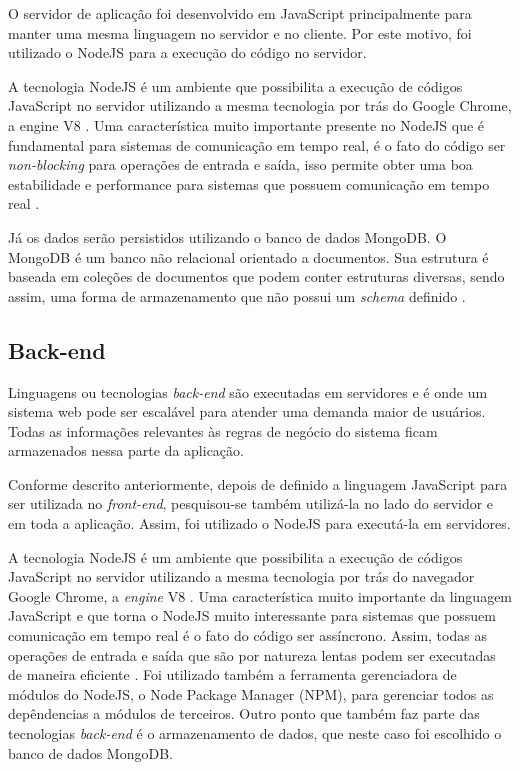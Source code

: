 O servidor de aplicação foi desenvolvido em JavaScript principalmente para manter uma mesma linguagem no servidor e no cliente. Por este motivo, foi utilizado o NodeJS para a execução do código no servidor.

A tecnologia NodeJS é um ambiente que possibilita a execução de códigos JavaScript no servidor utilizando a mesma tecnologia por trás do Google Chrome, a engine V8 \cite{nodejs}. Uma característica muito importante presente no NodeJS que é fundamental para sistemas de comunicação em tempo real, é o fato do código ser \emph{non-blocking} para operações de entrada e saída, isso permite obter uma boa estabilidade e performance para sistemas que possuem comunicação em tempo real \cite{nodejs}.

Já os dados serão persistidos utilizando o banco de dados MongoDB. O MongoDB é um banco não relacional orientado a documentos. Sua estrutura é baseada em coleções de documentos que podem conter estruturas diversas, sendo assim, uma forma de armazenamento que não possui um \emph{schema} definido \cite{mongodb}. 

\fi

\subsection{Back-end}
\label{sec:tecnologias_backend}

Linguagens ou tecnologias \emph{back-end} são executadas em servidores e é onde um sistema web pode ser escalável para atender uma demanda maior de usuários. Todas as informações relevantes às regras de negócio do sistema ficam armazenados nessa parte da aplicação.

Conforme descrito anteriormente, depois de definido a linguagem JavaScript para ser utilizada no \emph{front-end}, pesquisou-se também utilizá-la no lado do servidor e em toda a aplicação. Assim, foi utilizado o NodeJS para executá-la em servidores.

A tecnologia NodeJS é um ambiente que possibilita a execução de códigos JavaScript no servidor utilizando a mesma tecnologia por trás do navegador Google Chrome, a \emph{engine} V8 \cite{nodejs}. Uma característica muito importante da linguagem JavaScript e que torna o NodeJS muito interessante para sistemas que possuem comunicação em tempo real é o fato do código ser assíncrono. Assim, todas as operações de entrada e saída que são por natureza lentas podem ser executadas de maneira eficiente \cite{nodejs}. Foi utilizado também a ferramenta gerenciadora de módulos do NodeJS, o Node Package Manager (NPM), para gerenciar todos as depêndencias a módulos de terceiros. Outro ponto que também faz parte das tecnologias \emph{back-end} é o armazenamento de dados, que neste caso foi escolhido o banco de dados MongoDB.

